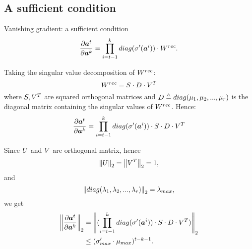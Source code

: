 \subsection{A sufficient condition}
\begin{frame}{Vanishing gradient: a sufficient condition}
	\begin{equation}
	\frac{\partial \boldsymbol{a}^t}{\partial \boldsymbol{a}^k} = \prod_{i=t-1}^{k}  diag(\sigma'(\boldsymbol{a}^i)) \cdot W^{rec}.
	\label{eq:temporalComponent}
	\end{equation}
	
	Taking the singular value decomposition of $W^{rec}$:
	\begin{equation}
	W^{rec} =  S\cdot D\cdot V^T
	\end{equation}
	where $S,V^T$ are squared orthogonal matrices and $D\triangleq diag(\mu_1, \mu_2,...,\mu_r)$ is the diagonal matrix containing the singular values of $W^{rec}$.
	Hence:
	\begin{equation}
	\frac{\partial \boldsymbol{a}^t}{\partial \boldsymbol{a}^k} = \prod_{i=t-1}^{k}  diag(\sigma'(\boldsymbol{a}^i)) \cdot S\cdot D \cdot V^T
	\end{equation}
\end{frame}
\begin{frame}
	Since $U$ and $V$ are orthogonal matrix, hence $$\left\Vert U \right\Vert_2=\left\Vert V^T \right\Vert_2 = 1,$$ and $$\left\Vert diag(\lambda_1, \lambda_2,...,\lambda_r) \right\Vert_2 = \lambda_{max},$$ we get
	\begin{align}
	\left\Vert \frac{\partial \boldsymbol{a}^t}{\partial \boldsymbol{a}^k} \right\Vert_2 &= \left\Vert  (\prod_{i=t-1}^{k} diag(\sigma'(\boldsymbol{a}^i)) \cdot S\cdot D \cdot V^T) \right\Vert_2\\
	&\leq (\sigma'_{max} \cdot \mu_{max})^{t-k-1}.
	\end{align}
\end{frame}

